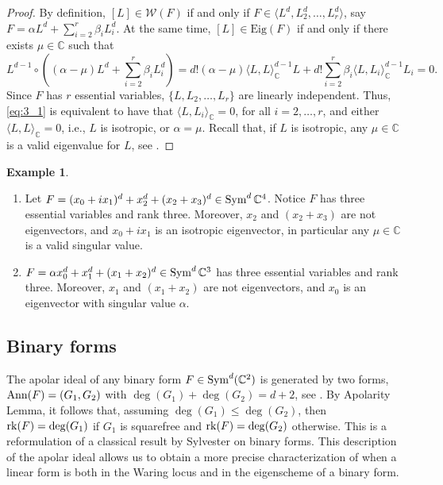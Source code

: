 \documentclass{amsart}
\numberwithin{theorem}{section}
\theoremstyle{definition}
\newtheorem{example}[theorem]{Example}
\newcommand{\Eig}{\mathrm{Eig}}
\newcommand{\W}{\mathcal{W}}
\newcommand{\CC}{\mathbb{C}}
\newcommand{\rk}{\mathop{\rm rk}\nolimits}
\newcommand{\sym}{\mathop{\rm Sym}\nolimits}
\begin{document}
\begin{proof}
    By definition, $[L] \in \W(F)$ if and only if $F \in \langle L^d,L_2^d,\ldots,L_r^d\rangle$, say $F = \alpha L^d + \sum_{i=2}^r \beta_iL_i^d$. At the same time, $[L] \in \Eig(F)$ if and only if there exists $\mu \in \CC$ such that
    \begin{equation}\label{eq:3_1}
        L^{d-1}\circ\left((\alpha-\mu) L^d+\sum_{i=2}^r\beta_iL_i^d\right)=d!(\alpha-\mu)\langle L,L\rangle_\CC^{d-1}L+d!\sum_{i=2}^r\beta_i\langle L,L_i\rangle_\CC^{d-1}L_i=0.
    \end{equation}
    Since $F$ has $r$ essential variables, $\{L,L_2,\ldots,L_r\}$ are linearly independent. Thus, \cref{eq:3_1} is equivalent to have that $\langle L,L_i \rangle_\CC = 0$, for all $i = 2,\ldots,r$, and either $\langle L,L \rangle_\CC = 0$, i.e., $L$ is isotropic, or $\alpha = \mu$. {Recall that, if $L$ is isotropic, any $\mu \in \CC$ is a valid eigenvalue for $L$, see .}
\end{proof}
\begin{example}
    \begin{enumerate}
        \item Let $F=(x_0+ix_1)^d+x_2^d+(x_2+x_3)^d\in \sym^d\CC^{4}$. Notice $F$ has three essential variables and rank three. Moreover, $x_2$ and $(x_2+x_3)$ are not eigenvectors, and $x_0+ix_1$ is an isotropic eigenvector, in particular any $\mu\in\CC$ is a valid singular value.
        \item $F=\alpha x_0^d+x_1^d+(x_1+x_2)^d\in \sym^d\CC^{3}$ has three essential variables and rank three. Moreover, $x_1$ and $(x_1+x_2)$ are not eigenvectors, and $x_0$ is an eigenvector with singular value $\alpha$.

    \end{enumerate}
    \end{example}

\subsection{Binary forms}
The apolar ideal of any binary form $F \in \sym^d(\CC^2)$ is generated by two forms, ${\rm Ann}(F) = (G_1,G_2)$ with $\deg(G_1)+\deg(G_2)=d+2$, see \cite[Theorem 1.44]{IarrobinoKanev}. By Apolarity Lemma, it follows that, assuming $\deg(G_1) \leq \deg(G_2)$, then $\rk(F) = \deg(G_1)$ if $G_1$ is squarefree and $\rk(F) = \deg(G_2)$ otherwise. This is a reformulation of a classical result by Sylvester on binary forms. This description of the apolar ideal allows us to obtain a more precise characterization of when a linear form is both in the Waring locus and in the eigenscheme of a binary form.
\end{document}
